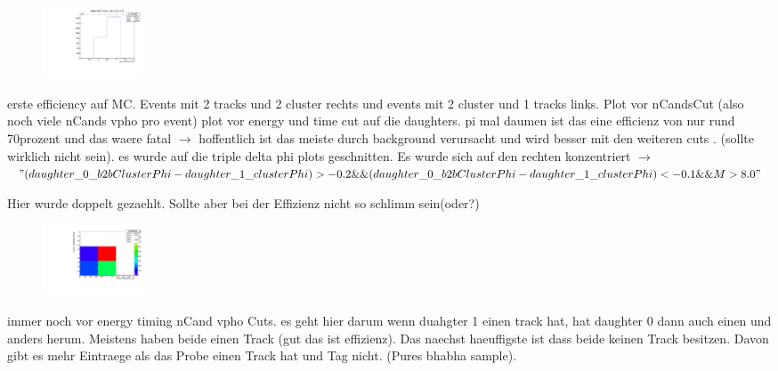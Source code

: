 \documentclass[10pt]{beamer}
\begin{document}
{\begin{frame}
\end{frame}

\begin{frame}

	\begin{figure}
		\includegraphics[width=3cm]{Collection/firstEffMC8NoEE}
	\end{figure}

erste efficiency auf MC. Events mit 2 tracks und 2 cluster rechts und events mit 2 cluster und 1 tracks links. Plot vor nCandsCut (also noch viele nCands vpho pro event) plot vor energy und time cut auf die daughters. pi mal daumen ist das eine efficienz von nur rund 70prozent und das waere fatal $\rightarrow$ hoffentlich ist das meiste durch background verursacht und wird besser mit den weiteren cuts . (sollte wirklich nicht sein). es wurde auf die triple delta phi plots geschnitten. Es wurde sich auf den rechten konzentriert $\rightarrow$ $"( daughter\_0\_b2bClusterPhi - daughter\_1\_clusterPhi) > -0.2 \&\& (daughter\_0\_b2bClusterPhi - daughter\_1\_clusterPhi) < -0.1 \&\& M>8.0"$

Hier wurde doppelt gezaehlt. Sollte aber bei der Effizienz nicht so schlimm sein(oder?) 


\end{frame}

\begin{frame}

\begin{figure}
	\includegraphics[width=3cm]{Collection/MCtrackMatch8}
\end{figure}
immer noch vor energy timing nCand vpho Cuts. es geht hier darum wenn duahgter 1 einen track hat, hat daughter 0 dann auch einen und anders herum. Meistens haben beide einen Track (gut das ist effizienz). Das naechst haeuffigste ist dass beide keinen Track besitzen. Davon gibt es mehr Eintraege als das Probe einen Track hat und Tag nicht. (Pures bhabha sample).


\end{frame}

}
\end{document}
